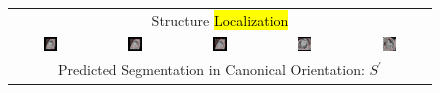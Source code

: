 \begin{figure}
\begin{center}
\begin{tabular}{ccccc}
\multicolumn{5}{c}{Structure \hl{Localization}} \\

\includegraphics[width=0.19\textwidth]{./data/representative-results/overt/HCMNet_1100083/00_SAX/BASE/0_bbox.png} &
\includegraphics[width=0.19\textwidth]{./data/representative-results/overt/HCMNet_1100083/00_SAX/MID/0_bbox.png} &
\includegraphics[width=0.19\textwidth]{./data/representative-results/overt/HCMNet_1100083/00_SAX/APEX/0_bbox.png} &
\includegraphics[width=0.19\textwidth]{./data/representative-results/overt/HCMNet_1100367/01_HLA/00/0_bbox.png} &
\includegraphics[width=0.19\textwidth]{./data/representative-results/overt/HCMNet_1100027/02_VLA/00/0_bbox.png} \\

\multicolumn{5}{c}{Predicted Segmentation in Canonical Orientation: $S^\prime$} \\


\end{tabular}
\end{center}
\end{figure}
